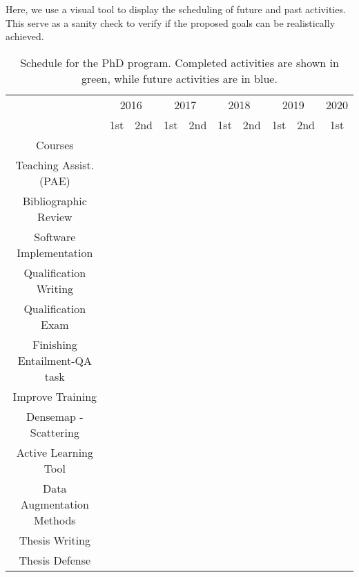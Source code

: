 Here, we use a visual tool to display the scheduling of future and past activities. This serve as a sanity check to verify if the
proposed goals can be realistically achieved.

\begin{table}[ht!]
  \center
  \begin{tabular}{|c|c|c|c|c|c|c|c|c|c|}\hline
    & \multicolumn{2}{c|}{2016} & \multicolumn{2}{c|}{2017} & \multicolumn{2}{c|}{2018} & \multicolumn{2}{c|}{2019} & \multicolumn{1}{c|}{2020} \\ \cline{2-10}
    \raisebox{1.5ex}{Activity} & 1st & 2nd & 1st & 2nd & 1st & 2nd & 1st & 2nd & 1st \\ \hline \hline
    Courses & \cellcolor{green!45} & \cellcolor{green!45} & \cellcolor{green!45}  & \cellcolor{green!45}  &  &  & & & \\ \hline
    Teaching Assist. (PAE) & & &  &  &\cellcolor{green!45}  &  & & & \\ \hline
    Bibliographic Review & \cellcolor{green!45} & \cellcolor{green!45} & \cellcolor{green!45} & \cellcolor{green!45} & \cellcolor{green!45} & &  &  & \\ \hline 
    Software Implementation & & & & \cellcolor{green!45} &\cellcolor{green!45}  & \cellcolor{blue!45} &\cellcolor{blue!45}&\cellcolor{blue!45}& \\ \hline
    Qualification Writing & & & & & \cellcolor{green!45} & &  & & \\ \hline
    Qualification Exam & & & & & \cellcolor{green!45} & & & & \\ \hline
    Finishing Entailment-QA task & & & & & & \cellcolor{blue!45} &  & & \\ \hline
    Improve Training & & & & & & \cellcolor{blue!45} &  & & \\ \hline
    Densemap - Scattering & & & &  & & \cellcolor{blue!25} & &  & \\ \hline
    Active Learning Tool & & & &  & &  & \cellcolor{blue!25} &  & \\ \hline
    Data Augmentation Methods & & & &  & &  & & \cellcolor{blue!25} & \\ \hline
    Thesis Writing & & & & & & & & \cellcolor{blue!25} & \\ \hline
    Thesis Defense & & & & & & & & & \cellcolor{blue!25}  \\ \hline
  \end{tabular}
  \caption{Schedule for the PhD program. Completed activities are shown in green, while future activities are in blue.}
  \label{tab:schedule}
\end{table}